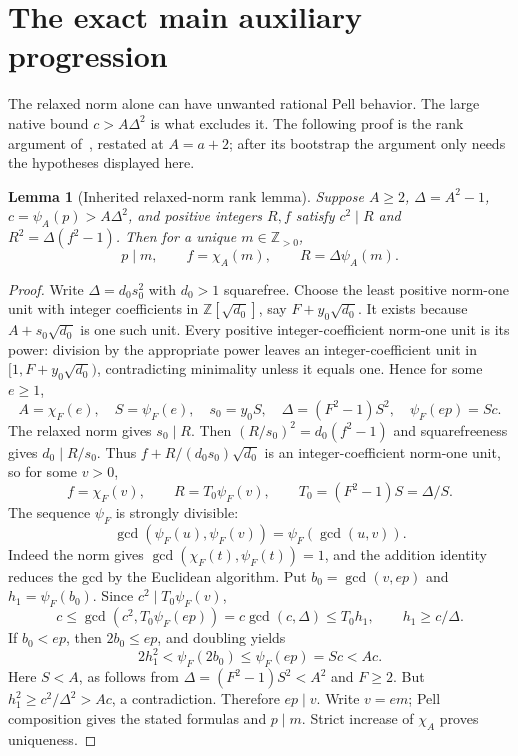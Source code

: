 \documentclass[11pt,letterpaper]{article}
\newtheorem{lemma}[theorem]{Lemma}
\theoremstyle{definition}\newtheorem{definition}[theorem]{Definition}
\theoremstyle{remark}\newtheorem{remark}[theorem]{Remark}
\newcommand{\Z}{\mathbb Z}\newcommand{\Np}{\mathbb Z_{>0}}
\begin{document}
\section{The exact main auxiliary progression}\label{fup:nf:sec:mainindex}
The relaxed norm alone can have unwanted rational Pell behavior. The large native bound $c>A\Delta^2$ is what excludes it. The following proof is the rank argument of~\cite{fup:nf:relaxed}, restated at $A=a+2$; after its bootstrap the argument only needs the hypotheses displayed here.

\begin{lemma}[Inherited relaxed-norm rank lemma]\label{fup:nf:lem:rank}
Suppose $A\ge2$, $\Delta=A^2-1$, $c=\psi_A(p)>A\Delta^2$, and positive integers $R,f$ satisfy $c^2\mid R$ and $R^2=\Delta(f^2-1)$. Then for a unique $m\in\Np$,
\[
 p\mid m,\qquad f=\chi_A(m),\qquad R=\Delta\psi_A(m).
\]
\end{lemma}
\begin{proof}
Write $\Delta=d_0s_0^2$ with $d_0>1$ squarefree. Choose the least positive norm-one unit with integer coefficients in $\Z[\sqrt{d_0}]$, say $F+y_0\sqrt{d_0}$. It exists because $A+s_0\sqrt{d_0}$ is one such unit. Every positive integer-coefficient norm-one unit is its power: division by the appropriate power leaves an integer-coefficient unit in $[1,F+y_0\sqrt{d_0})$, contradicting minimality unless it equals one. Hence for some $e\ge1$,
\[
 A=\chi_F(e),\quad S=\psi_F(e),\quad s_0=y_0S,
 \quad\Delta=(F^2-1)S^2,\quad\psi_F(ep)=Sc.
\]
The relaxed norm gives $s_0\mid R$. Then $(R/s_0)^2=d_0(f^2-1)$ and squarefreeness gives $d_0\mid R/s_0$. Thus $f+R/(d_0s_0)\sqrt{d_0}$ is an integer-coefficient norm-one unit, so for some $v>0$,
\[
 f=\chi_F(v),\qquad R=T_0\psi_F(v),\qquad
 T_0=(F^2-1)S=\Delta/S.
\]
The sequence $\psi_F$ is strongly divisible:
\[
 \gcd(\psi_F(u),\psi_F(v))=\psi_F(\gcd(u,v)).
\]
Indeed the norm gives $\gcd(\chi_F(t),\psi_F(t))=1$, and the addition identity reduces the gcd by the Euclidean algorithm. Put $b_0=\gcd(v,ep)$ and $h_1=\psi_F(b_0)$. Since $c^2\mid T_0\psi_F(v)$,
\[
 c\le\gcd(c^2,T_0\psi_F(ep))
    =c\gcd(c,\Delta)\le T_0h_1,
 \qquad h_1\ge c/\Delta.
\]
If $b_0<ep$, then $2b_0\le ep$, and doubling yields
\[
 2h_1^2<\psi_F(2b_0)\le\psi_F(ep)=Sc<Ac.
\]
Here $S<A$, as follows from $\Delta=(F^2-1)S^2<A^2$ and $F\ge2$. But $h_1^2\ge c^2/\Delta^2>Ac$, a contradiction. Therefore $ep\mid v$. Write $v=em$; Pell composition gives the stated formulas and $p\mid m$. Strict increase of $\chi_A$ proves uniqueness.
\end{proof}
\end{document}
